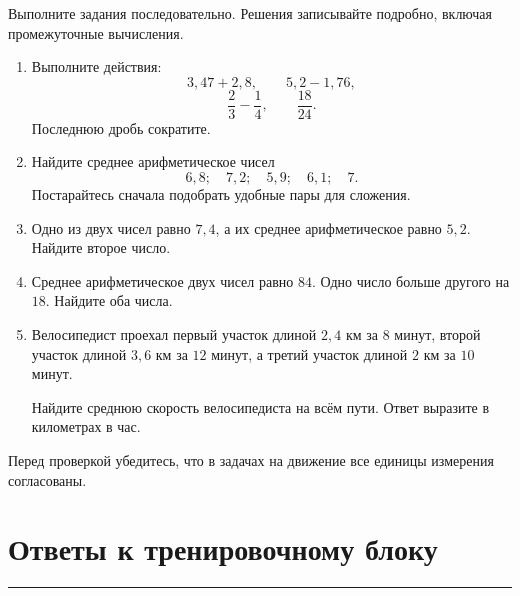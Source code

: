 \documentclass[a4paper,12pt]{article}
\begin{document}
Выполните задания последовательно.
Решения записывайте подробно, включая промежуточные вычисления.

\begin{enumerate}[label=\textbf{\arabic*.}]

  \item
  Выполните действия:
  \[
  3{,}47+2{,}8,
  \qquad
  5{,}2-1{,}76,
  \]
  \[
  \frac23-\frac14,
  \qquad
  \frac{18}{24}.
  \]
  Последнюю дробь сократите.

  \item
  Найдите среднее арифметическое чисел
  \[
  6{,}8;\quad
  7{,}2;\quad
  5{,}9;\quad
  6{,}1;\quad
  7.
  \]
  Постарайтесь сначала подобрать удобные пары для сложения.

  \item
  Одно из двух чисел равно $7{,}4$, а их среднее арифметическое
  равно $5{,}2$.
  Найдите второе число.

  \item
  Среднее арифметическое двух чисел равно $84$.
  Одно число больше другого на $18$.
  Найдите оба числа.

  \item
  Велосипедист проехал первый участок длиной $2{,}4$ км за
  $8$ минут, второй участок длиной $3{,}6$ км за $12$ минут,
  а третий участок длиной $2$ км за $10$ минут.

  Найдите среднюю скорость велосипедиста на всём пути.
  Ответ выразите в километрах в час.

\end{enumerate}

\vfill

\begin{center}
\textcolor{softgray}{
Перед проверкой убедитесь, что в задачах на движение
все единицы измерения согласованы.
}
\end{center}


\clearpage

\section*{\textcolor{darkaccent}{Ответы к тренировочному блоку}}

{\color{accent}\rule{\linewidth}{0.6pt}}

\vspace{1em}
\end{document}
